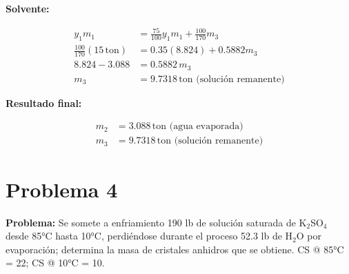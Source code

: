 \documentclass{article} %
\begin{document}
\begin{multicols}{2}
\textbf{Solvente:}

\begin{align*}
    y_{1}m_{1} &= \frac{75}{100}y_1 m_1 + \frac{100}{170} m_3 \\[10pt]
    \frac{100}{170} (15 \, \text{ton}) &= 0.35 (8.824) + 0.5882m_3 \\[10pt]
    8.824 - 3.088 &= 0.5882 \, m_3 \\[10pt]
    m_3 &= 9.7318 \, \text{ton (solución remanente)}
\end{align*}

\textbf{Resultado final:}

\begin{align*}
    m_2 &= 3.088 \, \text{ton (agua evaporada)} \\[10pt]
    m_3 &= 9.7318 \, \text{ton (solución remanente)}
\end{align*}
\end{multicols} %

\newpage %
\section*{Problema 4} %
\textbf{Problema:} Se somete a enfriamiento 190 lb de solución saturada de K$_2$SO$_4$ desde 85°C hasta 10°C, perdiéndose durante el proceso 52.3 lb de H$_2$O por evaporación; determina la masa de cristales anhidros que se obtiene.
CS @ 85°C = 22; CS @ 10°C = 10.
\end{document}
